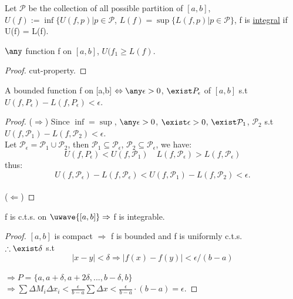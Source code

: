 \begin{definition}
    Let $\mathcal{P}$ be the collection of all possible partition of $[a,b]$, $U(f) := \inf\{ U(f, p) | p \in \mathcal{P}$, $L(f) = \sup \{ L(f,p) | p \in \mathcal{P}\}$, f is \uline{integral} if U(f) = L(f).
\end{definition}
\begin{lemma}
    $\any$  function f on $[a,b]$, $U(f_1 \geq L(f)$.
\end{lemma}
\begin{proof}
    cut-property.
\end{proof}
\begin{theorem}
    A bounded function f on [a,b] $\Leftrightarrow \any \epsilon >0$, $\exist P_\epsilon$ of $[a,b]$ s.t $U(f, P_\epsilon) - L(f, P_\epsilon) <\epsilon$.
\end{theorem}
\begin{proof}
    ($\Rightarrow$) Since $\inf = \sup$, $\any \epsilon >0$, $\exist \epsilon >0$, $\exist \mathcal{P}_1$, $\mathcal{P}_2$ s.t $U(f, \mathcal{P}_1) - L(f, \mathcal{P}_2) <\epsilon$. \\ 
    Let $\mathcal{P}_\epsilon = \mathcal{P}_1 \cup \mathcal{P}_2$, then $\mathcal{P}_1 \subseteq \mathcal{P}_\epsilon$, $\mathcal{P}_2 \subseteq \mathcal{P}_\epsilon$, we have: \\
    \[
    U(f, P_\epsilon) < U(f, \mathcal{P}_1) \quad L(f, \mathcal{P}_\epsilon) > L(f, \mathcal{P}_\epsilon)
    \]
    thus: 
    \[
    U(f, \mathcal{P}_\epsilon) - L (f, \mathcal{P}_\epsilon) < U(f, \mathcal{P}_1) - L(f, \mathcal{P}_2) < \epsilon. 
    \]  \\
    ($\Leftarrow$) %
\end{proof}
\begin{theorem}
    f is c.t.s. on $\uwave{[a,b]} \Rightarrow$ f is integrable. 
\end{theorem}
\begin{proof}
    $[a, b]$ is compact $\Rightarrow$ f is bounded and f is uniformly c.t.s. \\
    $\therefore \exist \delta$ s.t 
    \[
    |x-y| < \delta \Rightarrow |f(x)-f(y)| < \epsilon/(b-a)
    \]\\
    $\Rightarrow P = \{ a, a+ \delta, a+2\delta,..., b- \delta, b\}$ \\ %
    $\Rightarrow \sum \Delta M_i \Delta x_i < \frac{\epsilon}{b-a} \sum \Delta x < \frac{\epsilon}{b-a} \cdot (b-a) = \epsilon$.
\end{proof}
